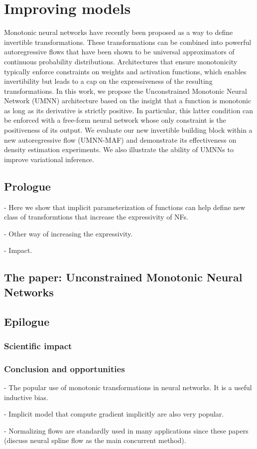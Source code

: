 \chapter{Improving models}\label{ch:05}

\begin{chapter_outline}

Monotonic neural networks have recently been proposed as a way to define invertible transformations.
These transformations can be combined into powerful autoregressive flows that have been shown to be universal approximators of continuous probability distributions.
Architectures that ensure monotonicity typically enforce constraints on weights and activation functions, which enables invertibility but leads to a cap on the expressiveness of the resulting transformations.
In this work, we propose the Unconstrained Monotonic Neural Network (UMNN) architecture based on the insight that a function is monotonic as long as its derivative is strictly positive. In particular, this latter condition can be enforced with a free-form neural network whose only constraint is the positiveness of its output.
We evaluate our new invertible building block within a new autoregressive flow (UMNN-MAF) and demonstrate its effectiveness on density estimation experiments.
We also illustrate the ability of UMNNs to improve variational inference.
\end{chapter_outline}

\section{Prologue}
- Here we show that implicit parameterization of functions can help define new class of transformtions that increase the expressivity of NFs.

- Other way of increasing the expressivity.

- Impact.

\section{The paper: Unconstrained Monotonic Neural Networks}


\section{Epilogue}

\subsection{Scientific impact}

\subsection{Conclusion and opportunities}
- The popular use of monotonic transformations in neural networks. It is a useful inductive bias.

- Implicit model that compute gradient implicitly are also very popular.

- Normalizing flows are standardly used in many applications since these papers (discuss neural spline flow as the main concurrent method).
